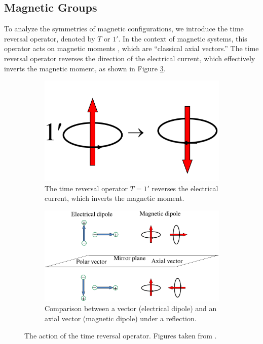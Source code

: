 \documentclass[12pt]{report}
\begin{document}
\subsection{Magnetic Groups} \label{subsec:magnetic_groups}

To analyze the symmetries of magnetic configurations, we introduce the time reversal operator, denoted by \(T\) or \(1'\). In the context of magnetic systems, this operator acts on magnetic moments \cite{magnetic_structures2012}, which are ``classical axial vectors.'' The time reversal operator reverses the direction of the electrical current, which effectively inverts the magnetic moment, as shown in Figure \ref{fig:timerev_axialvec}.

\begin{figure}[H]
\centering
\begin{subfigure}{.4\textwidth}
  \centering
  \includegraphics[height=0.6\linewidth]{fig/timerev.png}
  \caption{The time reversal operator $T = 1'$ reverses the electrical current, which inverts the magnetic moment.}
  \label{fig:timerev_a}
\end{subfigure} \hfill
\begin{subfigure}{.55\textwidth}
  \centering
  \includegraphics[width=\linewidth]{fig/axialvec.png}
  \caption{Comparison between a vector (electrical dipole) and an axial vector (magnetic dipole) under a reflection.}
  \label{fig:axialvec_b}
\end{subfigure}
\caption{The action of the time reversal operator. Figures taken from \cite{magnetic_structures2012}.}
\label{fig:timerev_axialvec}
\end{figure}
\end{document}
